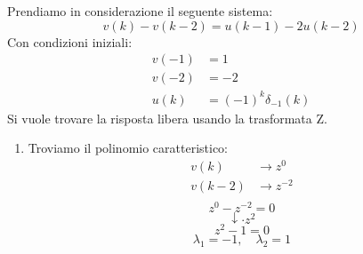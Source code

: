 \documentclass[a4paper]{article}
\begin{document}
\begin{example}
  Prendiamo in considerazione il seguente sistema:
  \[
    v(k) - v(k-2) = u(k-1) - 2u(k-2)
  \]
  Con condizioni iniziali:
  \[
    \begin{aligned}
      v(-1) &= 1 \\
      v(-2) &= -2 \\
      u(k) &= (-1)^k \delta_{-1}(k)
    \end{aligned}
  \] 
  Si vuole trovare la risposta libera usando la trasformata Z.
  \begin{enumerate}
    \item Troviamo il polinomio caratteristico:
      \[
      \begin{aligned}
        v(k) &\to z^0\\
        v(k-2) &\to z^{-2}\\
      \end{aligned}
      \] 
      \[
        z^0 - z^{-2} = 0
      \] 
      \[
        \downarrow \cdot z^2
      \] 
      \[
        z^2 - 1 = 0
      \] 
      \[
        \lambda_1 = -1, \quad \lambda_2 = 1
      \] 


\end{enumerate}
\end{example}
\end{document}
